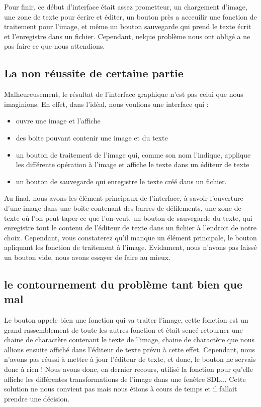 	Pour finir, ce début d'interface était assez prometteur, un chargement d'image, une zone de texte pour écrire et éditer, un bouton près a acceuilir une fonction de traitement pour l'image, et même un bouton sauvegarde qui prend le texte écrit et l'enregistre dans un fichier. Cependant, uelque problème nous ont obligé a ne pas faire ce que nous attendions.


	\subsection{La non réussite de certaine partie}

	Malheureusement, le résultat de l'interface graphique n'est pas celui que nous imaginions. En effet, dans l'idéal, nous voulions une interface qui :\\
	\begin{itemize}
		\item ouvre une image et l'affiche
		\item des boite pouvant contenir une image et du texte
		\item un bouton de traitement de l'image qui, comme son nom l'indique, applique les différente opération à l'image et affiche le texte dans un éditeur de texte
		\item un bouton de sauvegarde qui enregistre le texte créé dans un fichier.\\
	\end{itemize}
	Au final, nous avons les élément principaux de l'interface, à savoir l'ouverture d'une image dans une boite contenant des barres de défilements, une zone de texte où l'on peut taper ce que l'on veut, un bouton de sauvegarde du texte, qui enregistre tout le contenu de l'éditeur de texte dans un fichier à l'endroit de notre choix. Cependant, vous constaterez qu'il manque un élément principale, le bouton apliquant les fonction de traitement à l'image. Evidament, nous n'avons pas laissé un bouton vide, nous avons essayer de faire au mieux.

	\subsection{le contournement du problème tant bien que mal}
	Le bouton appele bien une fonction qui va traiter l'image, cette fonction est un grand rassemblement de toute les autres fonction et était sencé retourner une chaine de charactère contenant le texte de l'image, chaine de charactère que nous allions ensuite affiché dans l'éditeur de texte prévu à cette effet. Cependant, nous n'avons pas réussi à mettre à jour l'éditeur de texte, et donc, le bouton ne servais donc à rien ! Nous avons donc, en dernier recours, utilisé la fonction pour qu'elle affiche les différentes transformations de l'image dans une fenêtre SDL... Cette solution ne nous convient pas mais nous étions à cours de temps et il fallait prendre une décision.\\
